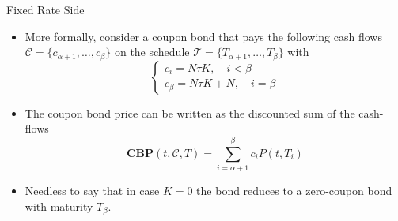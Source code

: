 \documentclass{beamer}
\begin{document}
\begin{frame}{Fixed Rate Side}
	\begin{itemize}
		\item<1-> More formally, consider a coupon bond that pays the following cash flows $\mathcal{C}=\{c_{\alpha+1},\ldots,c_\beta\}$ on the schedule $\mathcal{T} = \{T_{\alpha+1},\ldots,T_\beta\}$ with 
		\begin{equation*}
			\begin{cases}
				c_i = N\tau K,\quad i<\beta \\
				c_\beta=N\tau K+N, \quad i=\beta	
			\end{cases}		
		\end{equation*}
		\item<2-> The coupon bond price can be written as the discounted sum of the cash-flows
		\begin{equation}
			\textbf{CBP}(t,\mathcal{C},T)=\sum_{i=\alpha+1}^{\beta}c_i P(t,T_i)
		\end{equation}
		\item<3-> Needless to say that in case $K=0$ the bond reduces to a zero-coupon bond with maturity $T_\beta$.
		
	\end{itemize}
\end{frame}

\end{document}
